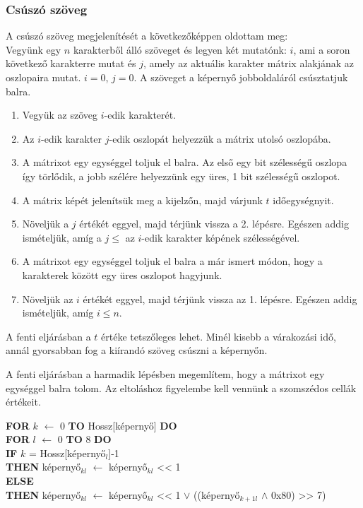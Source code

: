 \documentclass[a4paper, 12pt]{article}
\begin{document}
\subsubsection{Csúszó szöveg} \label{csuszo}
A csúszó szöveg megjelenítését a következőképpen oldottam meg:\\
Vegyünk egy $n$ karakterből álló szöveget és legyen két mutatónk: $i$, ami a soron következő karakterre mutat és $j$, amely az aktuális karakter mátrix alakjának az oszlopaira mutat. $i = 0$, $j = 0$.
A szöveget a képernyő jobboldaláról csúsztatjuk balra.
\begin{enumerate}
	\item Vegyük az szöveg $i$-edik karakterét.
	\item Az $i$-edik karakter $j$-edik oszlopát helyezzük a mátrix utolsó oszlopába.
	\item A mátrixot egy egységgel toljuk el balra. Az első egy bit szélességű oszlopa így törlődik, a jobb szélére helyezzünk egy üres, 1 bit szélességű oszlopot.
	\item A mátrix képét jelenítsük meg a kijelzőn, majd várjunk $t$ időegységnyit.
	\item Növeljük a $j$ értékét eggyel, majd térjünk vissza a 2. lépésre. Egészen addig ismételjük, amíg a $j \leq$ az $i$-edik karakter képének szélességével.
	\item A mátrixot egy egységgel toljuk el balra a már ismert módon, hogy a karakterek között egy üres oszlopot hagyjunk.
	\item Növeljük az $i$ értékét eggyel, majd térjünk vissza az 1. lépésre. Egészen addig ismételjük, amíg $i \leq n$.
\end{enumerate}

A fenti eljárásban a $t$ értéke tetszőleges lehet. Minél kisebb a várakozási idő, annál gyorsabban fog a kiírandó szöveg csúszni a képernyőn.

A fenti eljárásban a harmadik lépésben megemlítem, hogy a mátrixot egy egységgel balra tolom. Az eltoláshoz figyelembe kell vennünk a szomszédos cellák értékeit.

\bigskip

\bigskip

\noindent\textbf{FOR} $k$ $\leftarrow$ 0 \textbf{TO} Hossz[képernyő] \textbf{DO}\\
\indent \textbf{FOR} $l$ $\leftarrow$ 0 \textbf{TO} 8 \textbf{DO}\\
\indent \indent \textbf{IF} $k$ = Hossz[képernyő$_l$]-1\\
\indent \indent \indent \textbf{THEN} képernyő$_{kl}$ $\leftarrow$ képernyő$_{kl}$ << 1\\
\indent \indent \textbf{ELSE}\\
\indent \indent \indent \textbf{THEN} képernyő$_{kl}$ $\leftarrow$ képernyő$_{kl}$ << 1 $\lor$ ((képernyő$_{k+1l}$ $\land$ 0x80) >> 7)
\end{document}
